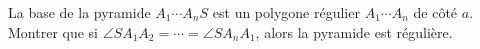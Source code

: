La base de la pyramide $A_1 \cdots A_nS$ est un polygone régulier $A_1 \cdots A_n$ de côté $a$. Montrer que si $\angle SA_1A_2 = \cdots = \angle SA_nA_1$, alors la pyramide est régulière.
